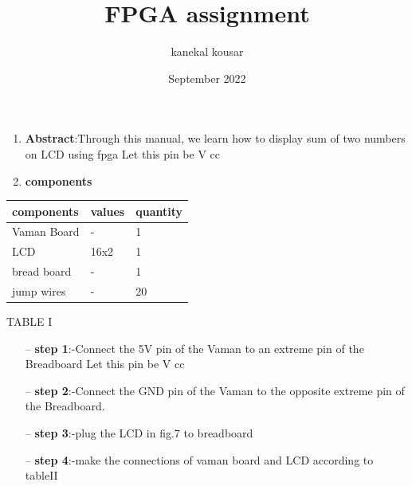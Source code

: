 \documentclass[journal,12pt,twocolumn]{IEEEtran}
\title{\textbf{FPGA assignment}}
\author{kanekal kousar}
\date{September 2022}
\begin{document}
\maketitle

\begin{enumerate}
    \item \textbf{Abstract}:Through this manual, we learn how to display sum of two numbers on LCD using fpga
Let this pin be V cc 
    \item \textbf{components}
\end{enumerate}
     \begin{tabular}{ |p{3cm}|p{1.5cm}|p{1.5cm}| }
 \hline
 \setlength{\tabcolsep}{3pt}
components & values & quantity \\
\hline
 Vaman Board &   - & 1\\
 LCD &16x2 & 1\\
 bread board  &-& 1\\
 jump wires&  - & 20\\
 \hline
\end{tabular}
\begin{center}
    TABLE I
\end{center}

\begin{enumerate}
    \item[--] \textbf{step 1}:-Connect the 5V pin of the Vaman to an extreme pin of the Breadboard
Let this pin be V cc 
    \item[--] \textbf{step 2}:-Connect the GND pin of the Vaman to the opposite extreme pin of the Breadboard.
     \item[--] \textbf{step 3}:-plug the LCD in fig.7 to breadboard
    \item[--] \textbf{step 4}:-make the connections of vaman board and LCD according to tableII
   
\end{enumerate}
\end{document}
